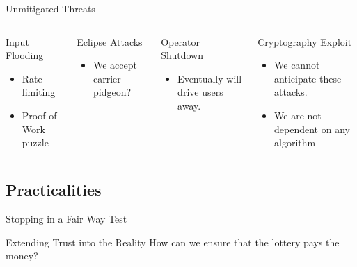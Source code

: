 \begin{frame}{Unmitigated Threats}
    \begin{columns}[T,onlytextwidth]

        \begin{block}{Input Flooding}
          \begin{itemize}
              \item Rate limiting
              \item Proof-of-Work puzzle
          \end{itemize}
        \end{block}

        \begin{block}{Eclipse Attacks}
            \begin{itemize}
                \item We accept carrier pidgeon?
            \end{itemize}
        \end{block}


        \begin{block}{Operator Shutdown}
            \begin{itemize}
                \item Eventually will drive users away.
            \end{itemize}
        \end{block}

        \begin{block}{Cryptography Exploit}
            \begin{itemize}
                \item We cannot anticipate these attacks.
                \item We are not dependent on any algorithm
            \end{itemize}
        \end{block}

      \end{columns}
\end{frame}

\subsection{Practicalities}

\begin{frame}{Stopping in a Fair Way}
    \centering
    Test
\end{frame}

\begin{frame}{Extending Trust into the Reality}
    \centering
    How can we ensure that the lottery pays the money?
\end{frame}
